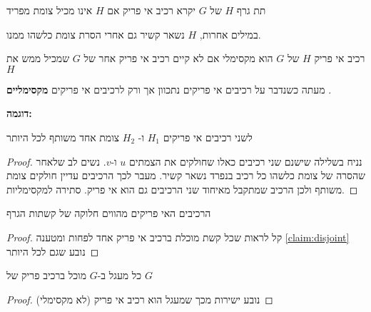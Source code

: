 \begin{definition}
תת גרף $H$ של $G$ יקרא רכיב אי פריק אם $H$ אינו מכיל צומת מפריד
\end{definition}

במילים אחרות, $H$ נשאר קשיר גם אחרי הסרת צומת כלשהו ממנו.

\begin{definition}
רכיב אי פריק $H$ של $G$ הוא מקסימלי אם לא קיים רכיב אי פריק אחר של $G$ שמכיל ממש את $H$
\end{definition}

מעתה כשנדבר על רכיבים אי פריקים נתכוון אך ורק לרכיבים אי פריקים 
\textbf{מקסימליים}
.

\textbf{דוגמה:}
\begin{center}
\end{center}

\begin{claim}
\label{claim:disjoint}
לשני רכיבים אי פריקים
$H_1$
ו-%
$H_2$
צומת אחד משותף לכל היותר
\end{claim}
\begin{proof}
נניח בשלילה שישנם שני רכיבים כאלו שחולקים את הצמתים $u$ ו-$v$.
נשים לב שלאחר שהסרה של צומת כלשהו כל רכיב בנפרד נשאר קשיר.
מעבר לכך הרכיבים עדיין חולקים צומת משותף ולכן הרכיב שמתקבל מאיחוד שני הרכיבים גם הוא אי פריק.
סתירה למקסימליות.
\end{proof}

\begin{claim}
הרכיבים האי פריקים מהווים חלוקה של קשתות הגרף
\end{claim}
\begin{proof}
קל לראות שכל קשת מוכלת ברכיב אי פריק אחד לפחות ומטענה 
\ref{claim:disjoint}
נובע שגם לכל היותר

\end{proof}
\begin{claim}
כל מעגל ב-$G$ מוכל ברכיב פריק של $G$
\end{claim}
\begin{proof}
נובע ישירות מכך שמעגל הוא רכיב אי פריק (לא מקסימלי)
\end{proof}

